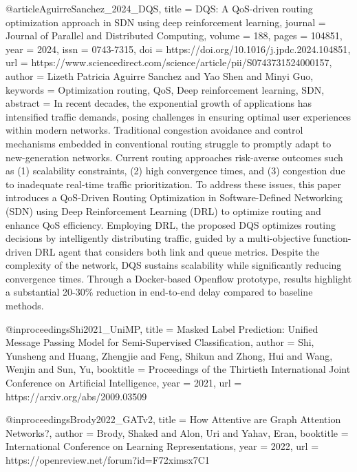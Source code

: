 {{{%
@article{AguirreSanchez_2024_DQS,
title = {{DQS: A QoS-driven routing optimization approach in SDN using deep reinforcement learning}},
journal = {Journal of Parallel and Distributed Computing},
volume = {188},
pages = {104851},
year = {2024},
issn = {0743-7315},
doi = {https://doi.org/10.1016/j.jpdc.2024.104851},
url = {https://www.sciencedirect.com/science/article/pii/S0743731524000157},
author = {Lizeth Patricia {Aguirre Sanchez} and Yao Shen and Minyi Guo},
keywords = {Optimization routing, QoS, Deep reinforcement learning, SDN},
abstract = {In recent decades, the exponential growth of applications has intensified traffic demands, posing challenges in ensuring optimal user experiences within modern networks. Traditional congestion avoidance and control mechanisms embedded in conventional routing struggle to promptly adapt to new-generation networks. Current routing approaches risk-averse outcomes such as (1) scalability constraints, (2) high convergence times, and (3) congestion due to inadequate real-time traffic prioritization. To address these issues, this paper introduces a QoS-Driven Routing Optimization in Software-Defined Networking (SDN) using Deep Reinforcement Learning (DRL) to optimize routing and enhance QoS efficiency. Employing DRL, the proposed DQS optimizes routing decisions by intelligently distributing traffic, guided by a multi-objective function-driven DRL agent that considers both link and queue metrics. Despite the complexity of the network, DQS sustains scalability while significantly reducing convergence times. Through a Docker-based Openflow prototype, results highlight a substantial 20-30\% reduction in end-to-end delay compared to baseline methods.}
}


@inproceedings{Shi2021_UniMP,
  title     = {{Masked Label Prediction: Unified Message Passing Model for Semi-Supervised Classification}},
  author    = {Shi, Yunsheng and Huang, Zhengjie and Feng, Shikun and Zhong, Hui and Wang, Wenjin and Sun, Yu},
  booktitle = {Proceedings of the Thirtieth International Joint Conference on Artificial Intelligence},
  year      = {2021},
  url       = {https://arxiv.org/abs/2009.03509}
}


@inproceedings{Brody2022_GATv2,
  title     = {{How Attentive are Graph Attention Networks?}},
  author    = {Brody, Shaked and Alon, Uri and Yahav, Eran},
  booktitle = {International Conference on Learning Representations},
  year      = {2022},
  url       = {https://openreview.net/forum?id=F72ximsx7C1}
}

}}}
